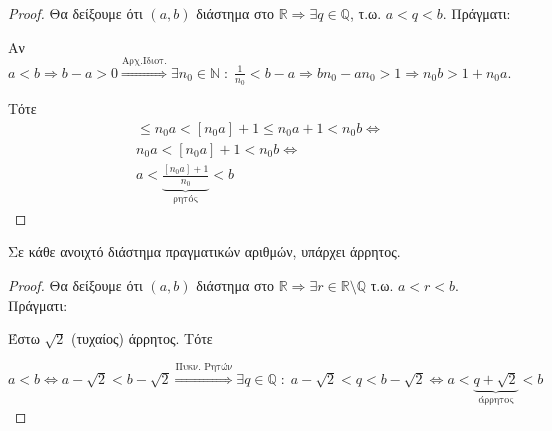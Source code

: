 \documentclass[main.tex]{subfiles}
\begin{document}
\begin{proof}
\item {}
    Θα δείξουμε ότι $ (a,b) $ διάστημα στο $ \mathbb{R} \Rightarrow \exists q 
    \in \mathbb{Q} $, τ.ω. $ a < q < b $. Πράγματι:

    Αν $ a<b \Rightarrow b-a >0 \overset{\text{Αρχ.Ιδιοτ.}}{\Rightarrow} \exists 
    n_{0} \in \mathbb{N} \; : \; \frac{1}{n_{0}} < b-a \Rightarrow b n_{0} - a n_{0} 
    >1 \Rightarrow n_{0}b > 1+ n_{0}a$.

    Τότε 
    \begin{gather*}
        [n_{0}a] \leq n_{0}a < [n_{0}a]+1 \leq n_{0}a +1 < n_{0}b \Leftrightarrow \\
        n_{0}a < [n_{0}a]+1 < n_{0}b \Leftrightarrow \\
        a < \underbrace{\frac{[n_{0}a]+1}{n_{0}}}_{\text{ρητός}}< b
    \end{gather*}
\end{proof}

\begin{prop}
    Σε κάθε ανοιχτό διάστημα πραγματικών αριθμών, υπάρχει άρρητος.
\end{prop}

\begin{proof}
    Θα δείξουμε ότι $ (a,b) $ διάστημα στο $ \mathbb{R} \Rightarrow \exists r \in 
    \mathbb{R} \setminus \mathbb{Q} $ τ.ω. $a < r < b$. Πράγματι:

    Έστω $ \sqrt{2} $ (τυχαίος) άρρητος. Τότε

    $ a < b \Leftrightarrow a - \sqrt{2} < b- \sqrt{2} \overset{\text{Πυκν. Ρητών}}{\Rightarrow} \exists q \in \mathbb{Q} \; : \;  a - \sqrt{2} < q < b - 
    \sqrt{2} \Leftrightarrow  a < \underbrace{q + \sqrt{2}}_{\text{άρρητος}} < b $ 
\end{proof}
\end{document}

